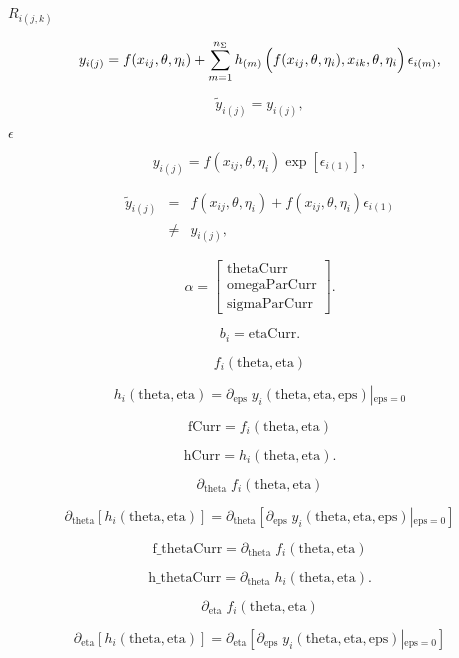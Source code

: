 \documentclass{article}
\begin{document}
$R_{i(j,k)}$
\pagebreak

\[ y_{i(j)} = f(x_{ij}, \theta, \eta_i) + \sum_{m=1}^{n_{\Sigma}} h_{(m)}\left( \rule{0.0in}{0.15in} f(x_{ij}, \theta, \eta_i), x_{ik}, \theta, \eta_i \right) \epsilon_{i(m)} , \]
\pagebreak

\[ \widetilde{y}_{i(j)} = y_{i(j)} , \]
\pagebreak

$\epsilon$
\pagebreak

\[ y_{i(j)} = f(x_{ij}, \theta, \eta_i) \exp[ \epsilon_{i(1)} ] , \]
\pagebreak

\begin{eqnarray} \widetilde{y}_{i(j)} & = & f(x_{ij}, \theta, \eta_i) + f(x_{ij}, \theta, \eta_i) \epsilon_{i(1)} \\ & \neq & y_{i(j)} , \end{eqnarray}
\pagebreak

\[ \alpha = \left[ \begin{array}{c} \mbox{thetaCurr} \\ \mbox{omegaParCurr} \\ \mbox{sigmaParCurr} \end{array} \right] . \]
\pagebreak

\[ b_i = \mbox{etaCurr} . \]
\pagebreak

\[ f_i(\mbox{theta}, \mbox{eta}) \]
\pagebreak

\[ h_i(\mbox{theta}, \mbox{eta}) = \partial_{\mbox{eps}} \; y_i(\mbox{theta}, \mbox{eta}, \mbox{eps}) \left|_{\mbox{eps}=0} \right. \]
\pagebreak

\[ \mbox{fCurr} = f_i(\mbox{theta}, \mbox{eta}) \]
\pagebreak

\[ \mbox{hCurr} = h_i(\mbox{theta}, \mbox{eta}) . \]
\pagebreak

\[ \partial_{\mbox{theta}} \; f_i(\mbox{theta}, \mbox{eta}) \]
\pagebreak

\[ \partial_{\mbox{theta}} \left[ h_i(\mbox{theta}, \mbox{eta}) \right] = \partial_{\mbox{theta}} \left[ \partial_{\mbox{eps}} \; y_i(\mbox{theta}, \mbox{eta}, \mbox{eps}) \left|_{\mbox{eps}=0} \right. \right] \]
\pagebreak

\[ \mbox{f_thetaCurr} = \partial_{\mbox{theta}} \; f_i(\mbox{theta}, \mbox{eta}) \]
\pagebreak

\[ \mbox{h_thetaCurr} = \partial_{\mbox{theta}} \; h_i(\mbox{theta}, \mbox{eta}) . \]
\pagebreak

\[ \partial_{\mbox{eta}} \; f_i(\mbox{theta}, \mbox{eta}) \]
\pagebreak

\[ \partial_{\mbox{eta}} \left[ h_i(\mbox{theta}, \mbox{eta}) \right] = \partial_{\mbox{eta}} \left[ \partial_{\mbox{eps}} \; y_i(\mbox{theta}, \mbox{eta}, \mbox{eps}) \left|_{\mbox{eps}=0} \right. \right] \]
\pagebreak
\end{document}
